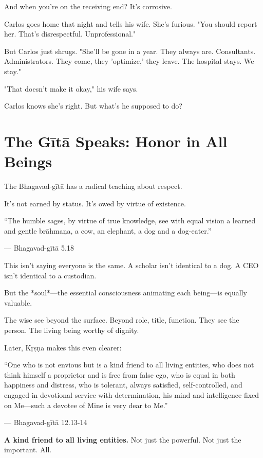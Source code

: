 \documentclass[11pt,twoside]{book}
\begin{document}
And when you're on the receiving end? It's corrosive.

Carlos goes home that night and tells his wife. She's furious. "You should report her. That's disrespectful. Unprofessional."

But Carlos just shrugs. "She'll be gone in a year. They always are. Consultants. Administrators. They come, they 'optimize,' they leave. The hospital stays. We stay."

"That doesn't make it okay," his wife says.

Carlos knows she's right. But what's he supposed to do?

\section*{The Gītā Speaks: Honor in All Beings}

The Bhagavad-gītā has a radical teaching about respect.

It's not earned by status. It's owed by virtue of existence.

\begin{pullquote}
``The humble sages, by virtue of true knowledge, see with equal vision a learned and gentle brāhmaṇa, a cow, an elephant, a dog and a dog-eater.''

--- Bhagavad-gītā 5.18
\end{pullquote}

This isn't saying everyone is the same. A scholar isn't identical to a dog. A CEO isn't identical to a custodian.

But the *soul*—the essential consciousness animating each being—is equally valuable.

The wise see beyond the surface. Beyond role, title, function. They see the person. The living being worthy of dignity.

Later, Kṛṣṇa makes this even clearer:

\begin{pullquote}
``One who is not envious but is a kind friend to all living entities, who does not think himself a proprietor and is free from false ego, who is equal in both happiness and distress, who is tolerant, always satisfied, self-controlled, and engaged in devotional service with determination, his mind and intelligence fixed on Me—such a devotee of Mine is very dear to Me.''

--- Bhagavad-gītā 12.13-14
\end{pullquote}

\textbf{\textbf{A kind friend to all living entities.}} Not just the powerful. Not just the important. All.
\end{document}
